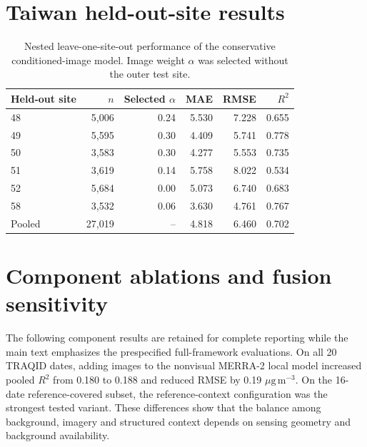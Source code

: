 \documentclass[review,12pt,authoryear]{elsarticle}
\newcommand{\ugm}{\ensuremath{\mu\mathrm{g}\,\mathrm{m}^{-3}}}
\newcommand{\Rtwo}{\ensuremath{R^2}}
\begin{document}
\section{Taiwan held-out-site results}

\begin{table}[H]
\centering
\caption{Nested leave-one-site-out performance of the conservative
conditioned-image model. Image weight $\alpha$ was selected without the outer
test site.}
\label{tab:taiwan-sites}
\begin{tabular}{lrrrrr}
\toprule
Held-out site & $n$ & Selected $\alpha$ & MAE & RMSE & \Rtwo \\
\midrule
48 & 5,006 & 0.24 & 5.530 & 7.228 & 0.655 \\
49 & 5,595 & 0.30 & 4.409 & 5.741 & 0.778 \\
50 & 3,583 & 0.30 & 4.277 & 5.553 & 0.735 \\
51 & 3,619 & 0.14 & 5.758 & 8.022 & 0.534 \\
52 & 5,684 & 0.00 & 5.073 & 6.740 & 0.683 \\
58 & 3,532 & 0.06 & 3.630 & 4.761 & 0.767 \\
\midrule
Pooled & 27,019 & -- & 4.818 & 6.460 & 0.702 \\
\bottomrule
\end{tabular}
\end{table}

\section{Component ablations and fusion sensitivity}
\label{app:component-audit}

The following component results are retained for complete reporting while the
main text emphasizes the prespecified full-framework evaluations. On all 20
TRAQID dates, adding images to the nonvisual MERRA-2 local model increased
pooled \Rtwo{} from 0.180 to 0.188 and reduced RMSE by 0.19 \ugm. On the
16-date reference-covered subset, the reference-context configuration was the
strongest tested variant. These differences show that the balance among
background, imagery and structured context depends on sensing geometry and
background availability.
\end{document}
